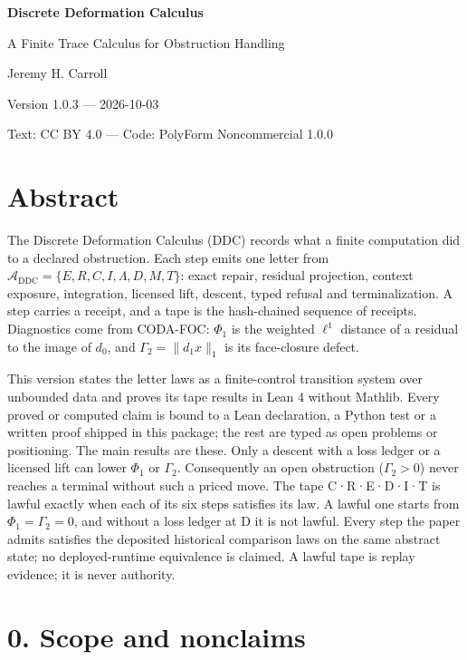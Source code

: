 \documentclass[
  11pt,
]{article}
\author{}
\date{}
\renewcommand{\_}{\ddcunderscore\allowbreak}
\begin{document}
\begin{center}
\label{discrete-deformation-calculus}
{\LARGE\bfseries Discrete Deformation Calculus}\par\medskip
{\large A Finite Trace Calculus for Obstruction Handling}\par\medskip
Jeremy H. Carroll\par
Version 1.0.3 --- 2026-10-03\par
Text: CC BY 4.0 --- Code: PolyForm Noncommercial 1.0.0
\end{center}

\section{Abstract}\label{abstract}

The Discrete Deformation Calculus (DDC) records what a finite
computation did to a declared obstruction. Each step emits one letter
from \(\mathcal{A}_{\mathrm{DDC}} = \{E, R, C, I, \Lambda, D, M, T\}\):
exact repair, residual projection, context exposure, integration,
licensed lift, descent, typed refusal and terminalization. A step
carries a receipt, and a tape is the hash-chained sequence of receipts.
Diagnostics come from CODA-FOC: \(\Phi_1\) is the weighted \(\ell^1\)
distance of a residual to the image of \(d_0\), and
\(\Gamma_2 = \lVert d_1 x \rVert_1\) is its face-closure defect.

This version states the letter laws as a finite-control transition
system over unbounded data and proves its tape results in Lean 4 without
Mathlib. Every proved or computed claim is bound to a Lean declaration,
a Python test or a written proof shipped in this package; the rest are
typed as open problems or positioning. The main results are these. Only
a descent with a loss ledger or a licensed lift can lower \(\Phi_1\) or
\(\Gamma_2\). Consequently an open obstruction (\(\Gamma_2 > 0\)) never
reaches a terminal without such a priced move. The tape C·R·E·D·I·T is
lawful exactly when each of its six steps satisfies its law. A lawful
one starts from \(\Phi_1 = \Gamma_2 = 0\), and without a loss ledger at
D it is not lawful. Every step the paper admits satisfies the deposited
historical comparison laws on the same abstract state; no
deployed-runtime equivalence is claimed. A lawful tape is replay
evidence; it is never authority.

\section{0. Scope and nonclaims}\label{scope-and-nonclaims}
\end{document}
